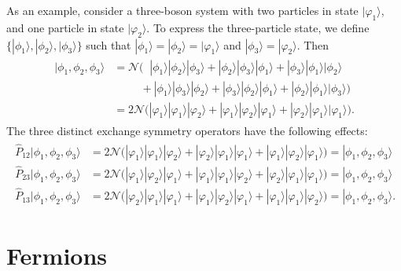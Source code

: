 \documentclass[pra,12pt]{revtex4}
\begin{document}
As an example, consider a three-boson system with two particles in
state $|\varphi_1\rangle$, and one particle in state
$|\varphi_2\rangle$.  To express the three-particle state, we define
$\{|\phi_1\rangle, |\phi_2\rangle, |\phi_3\rangle\}$ such that
$|\phi_1\rangle = |\phi_2\rangle = |\varphi_1\rangle$ and
$|\phi_3\rangle = |\varphi_2\rangle$.  Then
\begin{align}
  \begin{aligned}|\phi_1,\phi_2,\phi_3\rangle &= \mathcal{N} \Big( \;\;
|\phi_1\rangle|\phi_2\rangle|\phi_3\rangle +
|\phi_2\rangle|\phi_3\rangle|\phi_1\rangle +
|\phi_3\rangle|\phi_1\rangle|\phi_2\rangle \\ &\qquad\;\, +
|\phi_1\rangle|\phi_3\rangle|\phi_2\rangle +
|\phi_3\rangle|\phi_2\rangle|\phi_1\rangle +
|\phi_2\rangle|\phi_1\rangle|\phi_3\rangle\Big) \\
&= 2\mathcal{N} \Big(
|\varphi_1\rangle|\varphi_1\rangle|\varphi_2\rangle +
|\varphi_1\rangle|\varphi_2\rangle|\varphi_1\rangle +
|\varphi_2\rangle|\varphi_1\rangle|\varphi_1\rangle\Big).
  \end{aligned}
\end{align}
The three distinct exchange symmetry operators have the following effects:
\begin{align}
  \begin{aligned}\hat{P}_{12}|\phi_1,\phi_2,\phi_3\rangle &= 2\mathcal{N} \Big(
|\varphi_1\rangle|\varphi_1\rangle|\varphi_2\rangle +
|\varphi_2\rangle|\varphi_1\rangle|\varphi_1\rangle +
|\varphi_1\rangle|\varphi_2\rangle|\varphi_1\rangle\Big) = |\phi_1,\phi_2,\phi_3\rangle \\
\hat{P}_{23}|\phi_1,\phi_2,\phi_3\rangle &= 2\mathcal{N} \Big(
|\varphi_1\rangle|\varphi_2\rangle|\varphi_1\rangle +
|\varphi_1\rangle|\varphi_1\rangle|\varphi_2\rangle +
|\varphi_2\rangle|\varphi_1\rangle|\varphi_1\rangle\Big) = |\phi_1,\phi_2,\phi_3\rangle\\
\hat{P}_{13}|\phi_1,\phi_2,\phi_3\rangle &= 2\mathcal{N} \Big(
|\varphi_2\rangle|\varphi_1\rangle|\varphi_1\rangle +
|\varphi_1\rangle|\varphi_2\rangle|\varphi_1\rangle +
|\varphi_1\rangle|\varphi_1\rangle|\varphi_2\rangle\Big) = |\phi_1,\phi_2,\phi_3\rangle.
  \end{aligned}
\end{align}

\section{Fermions}
\end{document}
